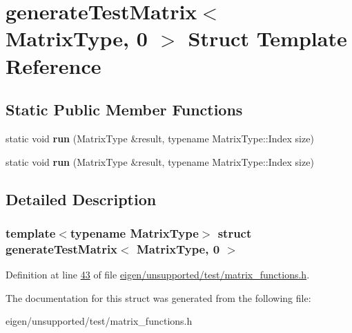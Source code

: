 \hypertarget{structgenerate_test_matrix_3_01_matrix_type_00_010_01_4}{}\section{generate\+Test\+Matrix$<$ Matrix\+Type, 0 $>$ Struct Template Reference}
\label{structgenerate_test_matrix_3_01_matrix_type_00_010_01_4}
\subsection*{Static Public Member Functions}
\begin{DoxyCompactItemize}
\item 
\mbox{\label{structgenerate_test_matrix_3_01_matrix_type_00_010_01_4_a5ac84a21ee6550f41bae4abef4d92db3}} 
static void {\bfseries run} (Matrix\+Type \&result, typename Matrix\+Type\+::\+Index size)
\item 
\mbox{\label{structgenerate_test_matrix_3_01_matrix_type_00_010_01_4_a5ac84a21ee6550f41bae4abef4d92db3}} 
static void {\bfseries run} (Matrix\+Type \&result, typename Matrix\+Type\+::\+Index size)
\end{DoxyCompactItemize}


\subsection{Detailed Description}
\subsubsection*{template$<$typename Matrix\+Type$>$\newline
struct generate\+Test\+Matrix$<$ Matrix\+Type, 0 $>$}



Definition at line \hyperlink{eigen_2unsupported_2test_2matrix__functions_8h_source_l00043}{43} of file \hyperlink{eigen_2unsupported_2test_2matrix__functions_8h_source}{eigen/unsupported/test/matrix\+\_\+functions.\+h}.



The documentation for this struct was generated from the following file\+:\begin{DoxyCompactItemize}
\item 
eigen/unsupported/test/matrix\+\_\+functions.\+h\end{DoxyCompactItemize}
